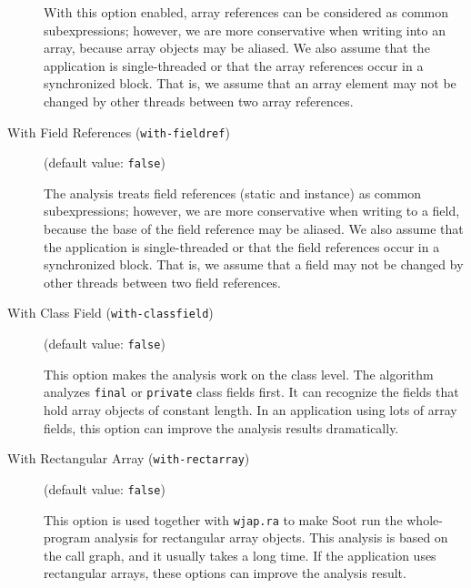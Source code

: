 \documentclass{article}
\begin{document}
\begin{description}
\par

With this option enabled, array references can be considered as
common subexpressions; however, we are more conservative when
writing into an array, because array objects may be aliased. We
also assume that the application is single-threaded or that the
array references occur in a synchronized block. That is, we
assume that an array element may not be changed by other threads
between two array references.



\item[With Field References ({\tt with-fieldref})]
(default value: {\tt false})





\par

The analysis treats field references (static and instance) as
common subexpressions; however, we are more conservative when
writing to a field, because the base of the field reference may
be aliased. We also assume that the application is
single-threaded or that the field references occur in a
synchronized block. That is, we assume that a field may
not be changed by other threads between two field references.



\item[With Class Field ({\tt with-classfield})]
(default value: {\tt false})





\par

This option makes the analysis work on the class level. The
algorithm analyzes {\tt final} or {\tt private} class
fields first. It can recognize the fields that hold array objects
of constant length.  In an application using lots of array
fields, this option can improve the analysis results
dramatically.



\item[With Rectangular Array ({\tt with-rectarray})]
(default value: {\tt false})




This option is used together with {\tt wjap.ra} to make Soot run the whole-program
analysis for rectangular array objects. This analysis is based on the
call graph, and it usually takes a long time. If the application uses
rectangular arrays, these options can improve the analysis
result.




\end{description}
\end{document}
